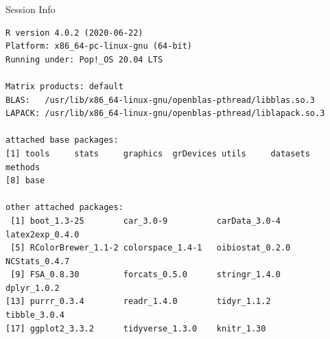 \documentclass[10pt]{beamer}\usepackage[]{graphicx}\usepackage[]{color}
\makeatletter
\newenvironment{kframe}{%
 \def\at@end@of@kframe{}%
 \ifinner\ifhmode%
  \def\at@end@of@kframe{\end{minipage}}%
  \begin{minipage}{\columnwidth}%
 \fi\fi%
 \def\FrameCommand##1{\hskip\@totalleftmargin \hskip-\fboxsep
 \colorbox{shadecolor}{##1}\hskip-\fboxsep
     \hskip-\linewidth \hskip-\@totalleftmargin \hskip\columnwidth}%
 \MakeFramed {\advance\hsize-\width
   \@totalleftmargin\z@ \linewidth\hsize
   \@setminipage}}%
 {\par\unskip\endMakeFramed%
 \at@end@of@kframe}
\newenvironment{knitrout}{}{} %
\makeatother
\begin{document}
\begin{frame}[fragile]{Session Info}
	\tiny
	
\begin{knitrout}\tiny
{}\color{fgcolor}\begin{kframe}
\begin{verbatim}
R version 4.0.2 (2020-06-22)
Platform: x86_64-pc-linux-gnu (64-bit)
Running under: Pop!_OS 20.04 LTS

Matrix products: default
BLAS:   /usr/lib/x86_64-linux-gnu/openblas-pthread/libblas.so.3
LAPACK: /usr/lib/x86_64-linux-gnu/openblas-pthread/liblapack.so.3

attached base packages:
[1] tools     stats     graphics  grDevices utils     datasets  methods  
[8] base     

other attached packages:
 [1] boot_1.3-25        car_3.0-9          carData_3.0-4      latex2exp_0.4.0   
 [5] RColorBrewer_1.1-2 colorspace_1.4-1   oibiostat_0.2.0    NCStats_0.4.7     
 [9] FSA_0.8.30         forcats_0.5.0      stringr_1.4.0      dplyr_1.0.2       
[13] purrr_0.3.4        readr_1.4.0        tidyr_1.1.2        tibble_3.0.4      
[17] ggplot2_3.3.2      tidyverse_1.3.0    knitr_1.30        


\end{verbatim}
\end{kframe}
\end{knitrout}
\end{frame}
\end{document}
